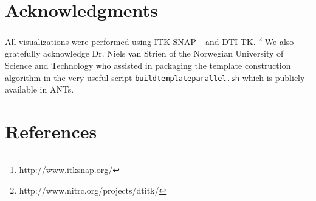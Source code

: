 \documentclass[final,5p,times,twocolumn]{elsarticle}
\begin{document}

\section*{Acknowledgments}
All visualizations were performed using ITK-SNAP%
\footnote{
http://www.itksnap.org/
}
\citep{Yushkevich2006} and
DTI-TK.%
\footnote{
http://www.nitrc.org/projects/dtitk/
}
We also gratefully acknowledge Dr. Niels van Strien of the Norwegian University of Science and Technology
who assisted in packaging the template construction algorithm in the very useful script \verb#buildtemplateparallel.sh#
which is publicly available in ANTs.

\section*{References}










\end{document}
